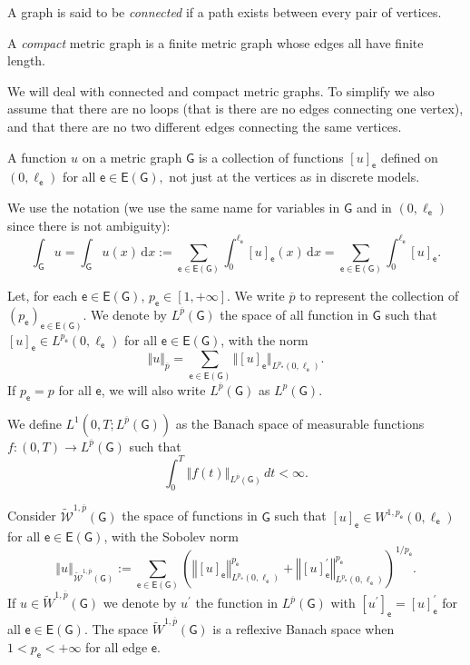 \documentclass[reqno,12pt]{amsart}
\newcommand{\norm}[1]{\left\Vert #1 \right\Vert} %
\renewcommand{\d}{\,\mathrm{d}} %
\def\e{\mathsf{e}} 	%
\newcommand{\G}{\mathsf{G}}	%
\newcommand{\E}{\mathsf{E}}	%
\numberwithin{equation}{section} %
\begin{document}
  A graph is said to be
{\it connected} if a path exists between every pair of vertices.

 A {\it compact} metric graph is a finite metric graph whose edges  all have finite
length.

We will deal with   connected and compact metric graphs.  To simplify we also assume that there are no loops (that is there are no edges connecting one vertex), and that there are no two different edges connecting the same vertices.
 

A function $u$ on a metric graph $\G$ is a collection of functions $[u]_{\e}$
defined on
$(0,\ell_{\e})$  for all $\e\in \E(\G),$
not just at the vertices as in discrete models.

We use the notation (we use the same name for variables in $\G$ and in $(0,\ell_\e)$ since there is not ambiguity):
$$ \int_{\G} u
=
\int_{\G} u(x) \d x
:=
\sum_{\e\in \E(\G)} \int_{0}^{\ell_{\e}} [u]_{\e}(x)\d x=\sum_{\e\in \E(\G)} \int_{0}^{\ell_{\e}} [u]_{\e}.
$$



Let, for each $\e\in \E(\G)$,  $p_\e\in
[1,+\infty]$.   We write $\overline{p}$ to represent  the collection of $(p_\e)_{\e \in \E(\G)}$. We denote by $L^{\overline{p}}(\G)$ the space of all function in $\G$ such that $[u]_\e \in L^{p_\e}(0,\ell_{\e})$  for all $\e\in \E(\G)$, with the norm
$$\Vert u \Vert_{\overline{p}} = \sum_{\e\in \E(\G)} \Vert [u]_\e \Vert_{L^{p_\e}(0,\ell_{\e})}.$$
 If $p_\e=p$ for all $\e$, we will also write $L^{\overline p}(\G)$ as $L^p(\G)$. 

  We define  $L^{1}(0, T; L^{\overline{p}}(\G))$ as the Banach space of  measurable functions $f : (0,T) \rightarrow  L^{\overline{p}}(\G)$ such that
$$\int_0^T \norm{f(t)}_{L^{\overline{p}}(\G)} \, dt < \infty.$$


  

Consider
$\widetilde{\mathcal{W}}^{1,\overline{p}}(\G)$ the space of functions in $\G$ such that
$[u]_{\e}\in W^{1,p_\e}(0,\ell_{\e})$
for all $\e\in \E(\G)$, with the Sobolev norm
$$
\norm{u}_{\widetilde{\mathcal{W}}^{1,\overline{p}}(\G)}
:=
\sum_{\e\in \E(\G)} \left(
\norm{[u]_{\e}}_{L^{p_\e}(0,\ell_{\e})}^{p_\e}+
\norm{[u]_{\e}^\prime}_{L^{p_\e}(0,\ell_{\e})}^{p_\e}\right)^{1/p_\e}.
$$
If $u\in\widetilde W^{1,\overline{p}}(\G)$ we denote by $u^\prime$ the function in $L^{\overline{p}}(\G)$ with $[u^\prime]_\e=[u]_\e^\prime$ for all $\e\in\E(\G)$.
The space $\widetilde W^{1,\overline{p}}(\G)$ is a reflexive Banach space when $1<p_\e<+\infty$ for all edge $\e$.
\end{document}
